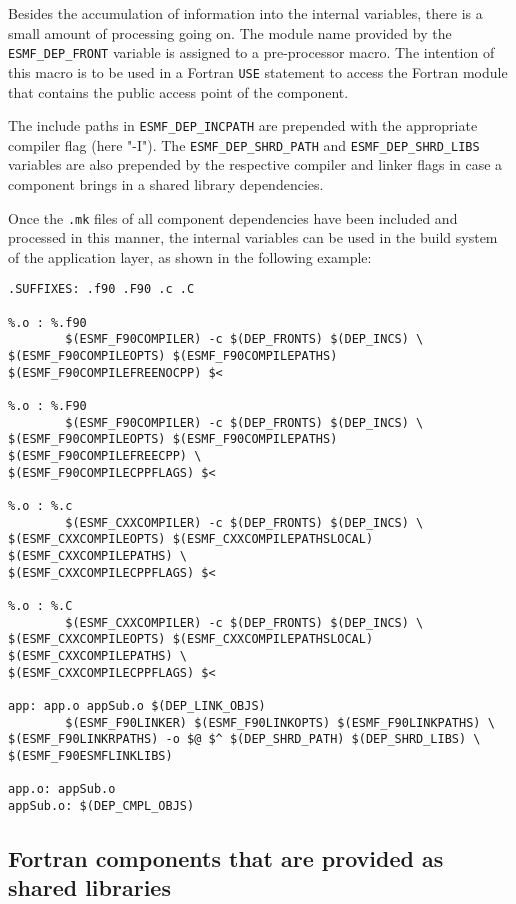 Besides the accumulation of information into the internal variables, there is a small amount of processing going on. The module name provided by the {\tt ESMF\_DEP\_FRONT} variable is assigned to a pre-processor macro. The intention of this macro is to be used in a Fortran {\tt USE} statement to access the Fortran module that contains the public access point of the component.

The include paths in {\tt ESMF\_DEP\_INCPATH} are prepended with the appropriate compiler flag (here "-I"). The {\tt ESMF\_DEP\_SHRD\_PATH} and {\tt ESMF\_DEP\_SHRD\_LIBS} variables are also prepended by the respective compiler and linker flags in case a component brings in a shared library dependencies.

Once the {\tt .mk} files of all component dependencies have been included and processed in this manner, the internal variables can be used in the build system of the application layer, as shown in the following example:

\begin{verbatim}
.SUFFIXES: .f90 .F90 .c .C

%.o : %.f90
        $(ESMF_F90COMPILER) -c $(DEP_FRONTS) $(DEP_INCS) \
$(ESMF_F90COMPILEOPTS) $(ESMF_F90COMPILEPATHS) $(ESMF_F90COMPILEFREENOCPP) $<

%.o : %.F90
        $(ESMF_F90COMPILER) -c $(DEP_FRONTS) $(DEP_INCS) \
$(ESMF_F90COMPILEOPTS) $(ESMF_F90COMPILEPATHS) $(ESMF_F90COMPILEFREECPP) \
$(ESMF_F90COMPILECPPFLAGS) $<
        
%.o : %.c
        $(ESMF_CXXCOMPILER) -c $(DEP_FRONTS) $(DEP_INCS) \
$(ESMF_CXXCOMPILEOPTS) $(ESMF_CXXCOMPILEPATHSLOCAL) $(ESMF_CXXCOMPILEPATHS) \
$(ESMF_CXXCOMPILECPPFLAGS) $<

%.o : %.C
        $(ESMF_CXXCOMPILER) -c $(DEP_FRONTS) $(DEP_INCS) \
$(ESMF_CXXCOMPILEOPTS) $(ESMF_CXXCOMPILEPATHSLOCAL) $(ESMF_CXXCOMPILEPATHS) \ 
$(ESMF_CXXCOMPILECPPFLAGS) $<

app: app.o appSub.o $(DEP_LINK_OBJS)
        $(ESMF_F90LINKER) $(ESMF_F90LINKOPTS) $(ESMF_F90LINKPATHS) \
$(ESMF_F90LINKRPATHS) -o $@ $^ $(DEP_SHRD_PATH) $(DEP_SHRD_LIBS) \
$(ESMF_F90ESMFLINKLIBS)

app.o: appSub.o
appSub.o: $(DEP_CMPL_OBJS)

\end{verbatim}

\subsection{Fortran components that are provided as shared libraries}
\label{StandardCompDep:FortranSharedLib}

